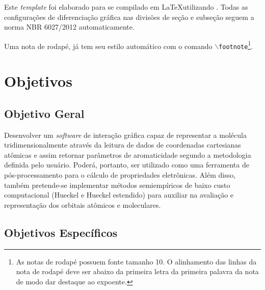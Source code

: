 Este \emph{template} foi elaborado para se compilado em \LaTeX utilizando \abnTeX.  Todas as configurações de diferenciação gráfica nas divisões de seção e subseção seguem a  norma NBR 6027/2012 automaticamente. 

Uma nota de rodapé, já tem seu estilo automático com o comando \texttt{$\backslash$footnote}\footnote{As notas de rodapé possuem fonte tamanho 10. O alinhamento das linhas da nota de rodapé deve ser abaixo da primeira letra da primeira palavra da nota de modo dar destaque ao expoente.}.


\chapter{Objetivos}

\section{Objetivo Geral}

 Desenvolver um \textit{software} de interação gráfica capaz de representar a molécula tridimensionalmente através da leitura de dados de coordenadas cartesianas atômicas e assim retornar parâmetros de aromaticidade segundo a metodologia definida pelo usuário. Poderá, portanto, ser utilizado como uma ferramenta de pós-processamento para o cálculo de propriedades eletrônicas. Além disso, também pretende-se implementar métodos semiempíricos de baixo custo computacional (Hueckel e Hueckel estendido) para auxiliar na avaliação e representação dos orbitais atômicos e moleculares.

\section{Objetivos Específicos}

